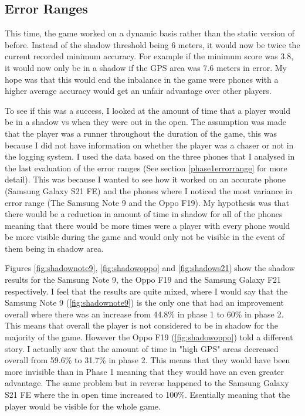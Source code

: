 \documentclass{l4proj}
\begin{document}
\subsection{Error Ranges}
This time, the game worked on a dynamic basis rather than the static version of before. Instead of the shadow threshold being
6 meters, it would now be twice the current recorded minimum accuracy. For example if the minimum score was 3.8, it would now
only be in a shadow if the GPS area was 7.6 meters in error. My hope was that this would end the inbalance in the game were
phones with a higher average accuracy would get an unfair advantage over other players.

To see if this was a success, I looked at the amount of time that a player would be in a shadow vs when they were out in the
open. The assumption was made that the player was a runner throughout the duration of the game, this was because I did not have
information on whether the player was a chaser or not in the logging system. I used the data based on the three phones that I 
analysed in the last evaluation of the error ranges (See section \ref{phase1errorrange} for more detail). This was because I wanted
to see how it worked on an accurate phone (Samsung Galaxy S21 FE) and the phones where I noticed the most variance in error range (The Samsung Note 9 and the Oppo F19).
My hypothesis was that there would be a reduction in amount of time in shadow for all of the phones meaning that there would be
more times were a player with every phone would be more visible during the game and would only not be visible in the event of
them being in shadow area.

Figures \ref{fig:shadownote9}, \ref{fig:shadowoppo} and \ref{fig:shadows21} show the shadow results for the Samsung Note 9,
the Oppo F19 and the Samsung Galaxy F21 respectively. I feel that the results are quite mixed, where I would say that the
Samsung Note 9 (\ref{fig:shadownote9}) is the only one that had an improvement overall where there was an increase from
44.8\% in phase 1 to 60\% in phase 2. This means that overall the player is not considered to be in shadow for the majority
of the game. However the Oppo F19 (\ref{fig:shadowoppo}) told a different story. I actually saw that the amount
of time in "high GPS" areas decreased overall from 59.6\% to 31.7\% in phase 2. This means that they would have been more
invisible than in Phase 1 meaning that they would have an even greater advantage. The same problem but in reverse happened
to the Samsung Galaxy S21 FE where the in open time increased to 100\%. Esentially meaning that the player would be visible
for the whole game.
\end{document}
